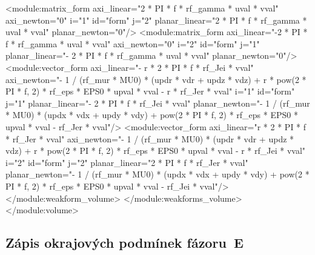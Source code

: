 \documentclass[12pt,a4paper,oneside]{article}
\numberwithin{equation}{section} %
\numberwithin{figure}{section} %
\numberwithin{table}{section} %
\begin{document}
\begin{spverbatim}
        <module:matrix_form axi_linear="2 * PI * f * rf_gamma * uval * vval" axi_newton="0" i="1" id="form" j="2" planar_linear="2 * PI * f * rf_gamma * uval * vval" planar_newton="0"/>
        <module:matrix_form axi_linear="-2 * PI * f * rf_gamma * uval * vval" axi_newton="0" i="2" id="form" j="1" planar_linear="- 2 * PI * f * rf_gamma * uval * vval" planar_newton="0"/>
        <module:vector_form axi_linear="- r * 2 * PI * f * rf_Jei * vval" axi_newton="- 1 / (rf_mur * MU0) * (updr * vdr + updz * vdz) + r * pow(2 * PI * f, 2) * rf_eps * EPS0 * upval * vval - r * rf_Jer * vval" i="1" id="form" j="1" planar_linear="- 2 * PI * f * rf_Jei * vval" planar_newton="- 1 / (rf_mur * MU0) * (updx * vdx + updy * vdy) + pow(2 * PI * f, 2) * rf_eps * EPS0 * upval * vval - rf_Jer * vval"/>
        <module:vector_form axi_linear="r * 2 * PI * f * rf_Jer * vval" axi_newton="- 1 / (rf_mur * MU0) * (updr * vdr + updz * vdz) + r * pow(2 * PI * f, 2) * rf_eps * EPS0 * upval * vval - r * rf_Jei * vval" i="2" id="form" j="2" planar_linear="2 * PI * f * rf_Jer * vval" planar_newton="- 1 / (rf_mur * MU0) * (updx * vdx + updy * vdy) + pow(2 * PI * f, 2) * rf_eps * EPS0 * upval * vval - rf_Jei * vval"/>
      </module:weakform_volume>
    </module:weakforms_volume>
  </module:volume>
\end{spverbatim}


\subsection*{Zápis okrajových podmínek fázoru~E}
\label{xmlEs}
\end{document}
